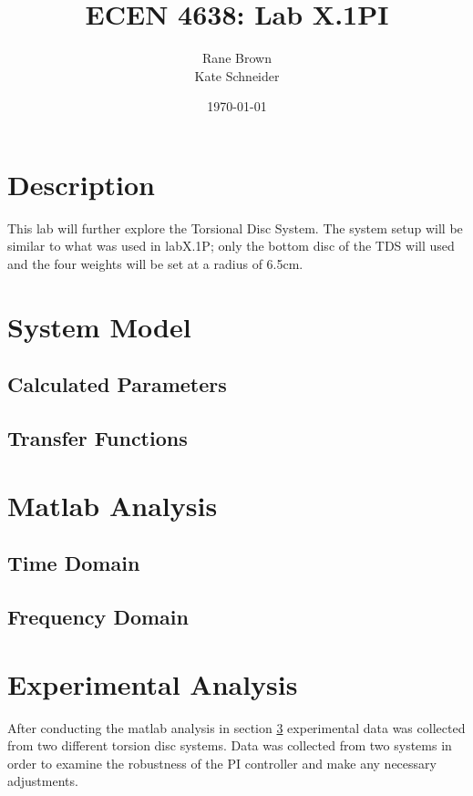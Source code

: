 \documentclass[11pt,titlepage]{article}
\author{Rane Brown \\ Kate Schneider}
\title{ECEN 4638: Lab X.1PI}
\date{\today}
\begin{document}
\maketitle
\tableofcontents
\listoffigures
\newpage

\section{Description}
    This lab will further explore the Torsional Disc System. The system setup will be similar to what was used in labX.1P; only the bottom disc of the TDS will used and the four weights will be set at a radius of 6.5cm.

\section{System Model}
    \subsection{Calculated Parameters}

    \subsection{Transfer Functions} \label{sec:tf}

\section{Matlab Analysis}\label{sec:mat_anys}
    \subsection{Time Domain}

    \subsection{Frequency Domain}

\section{Experimental Analysis}
    After conducting the matlab analysis in section \ref{sec:mat_anys} experimental data was collected from two different torsion disc systems. Data was collected from two systems in order to examine the robustness of the PI controller and make any necessary adjustments.
\end{document}
